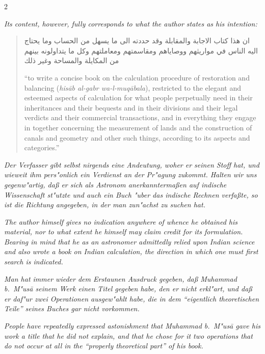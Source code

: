 \documentclass[10pt,a4paper]{article}
\newcommand{\RL}[1]{\beginR#1\endR}
\newcommand{\arblock}[1]{{\arabicfont\large\RL{#1}}}
\newcommand{\enquote}[1]{``#1''}
\begin{document}
\begin{paracol}{2}
\switchcolumn

\textit{Its content, however, fully corresponds to what the author states as his intention:}

\begin{quote}
\arblock{ان هذا كتاب الاجابة والمقابلة وقد حددته الى ما يسهل من الحساب وما يحتاج اليه الناس في مواريثهم ووصاياهم ومقاسمتهم ومعاملتهم وكل ما يتداولونه بينهم من المكايلة والمساحة وغير ذلك}

\enquote{to write a concise book on the calculation procedure of restoration and balancing (\textit{his\=ab al-gabr wa-l-muq\=abala}), restricted to the elegant and esteemed aspects of calculation for what people perpetually need in their inheritances and their bequests and in their divisions and their legal verdicts and their commercial transactions, and in everything they engage in together concerning the measurement of lands and the construction of canals and geometry and other such things, according to its aspects and categories.}
\end{quote}

\switchcolumn*

\textit{Der Verfasser gibt selbst nirgends eine Andeutung, woher er seinen Stoff hat, und wieweit ihm pers"onlich ein Verdienst an der Pr"agung zukommt. Halten wir uns gegenw"artig, da\ss{} er sich als Astronom anerkannterma\ss{}en auf indische Wissenschaft st"utzte und auch ein Buch "uber das indische Rechnen verfa\ss{}te, so ist die Richtung angegeben, in der man zun"achst zu suchen hat.}

\switchcolumn

\textit{The author himself gives no indication anywhere of whence he obtained his material, nor to what extent he himself may claim credit for its formulation. Bearing in mind that he as an astronomer admittedly relied upon Indian science and also wrote a book on Indian calculation, the direction in which one must first search is indicated.}

\switchcolumn*

\textit{Man hat immer wieder dem Erstaunen Ausdruck gegeben, da\ss{} Muhammad b.\ M"us\=a seinem Werk einen Titel gegeben habe, den er nicht erkl"art, und da\ss{} er daf"ur zwei Operationen ausgew"ahlt habe, die in dem \enquote{eigentlich theoretischen Teile} seines Buches gar nicht vorkommen.}

\switchcolumn

\textit{People have repeatedly expressed astonishment that Muhammad b.\ M"us\=a gave his work a title that he did not explain, and that he chose for it two operations that do not occur at all in the \enquote{properly theoretical part} of his book.}


\end{paracol}
\end{document}
